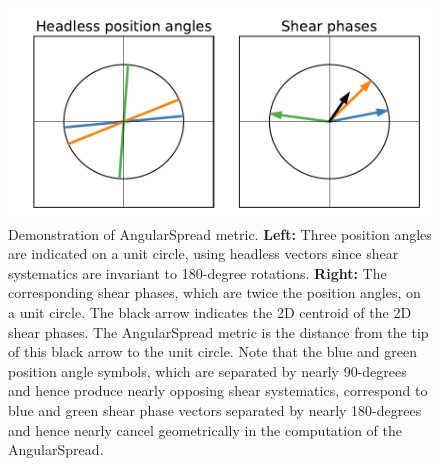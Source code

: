 \begin{figure}
\centering
\includegraphics[width=\linewidth]{figs/WL/angularSpread.pdf}
\caption{Demonstration of AngularSpread metric.  \textbf{Left:} Three position
angles are indicated on a unit circle, using headless vectors since shear
systematics are invariant to 180-degree rotations.  \textbf{Right:} The
corresponding shear phases, which are twice the position angles, on a unit circle.
The black arrow indicates the 2D centroid of the 2D shear phases.  The
AngularSpread metric is the distance from the tip of this black arrow to the unit
circle.  Note that the blue and green position angle symbols, which are separated
by nearly 90-degrees and hence produce nearly opposing shear systematics, correspond
to blue and green shear phase vectors separated by nearly 180-degrees and hence
nearly cancel geometrically in the computation of the AngularSpread.}
\label{fig:angularSpread}
\end{figure}



